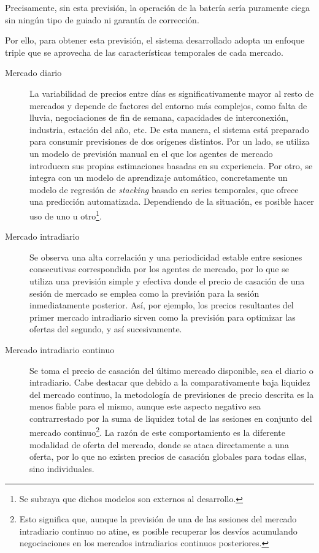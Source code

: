 Precisamente, sin esta previsión, la operación de la batería sería puramente ciega sin ningún tipo de guiado ni garantía de corrección.

Por ello, para obtener esta previsión, el sistema desarrollado adopta un enfoque triple que se aprovecha de las características temporales de cada mercado.

\begin{description}

  \item[Mercado diario] La variabilidad de precios entre días es significativamente mayor al resto de mercados y depende de factores del entorno más complejos, como falta de lluvia, negociaciones de fin de semana, capacidades de interconexión, industria, estación del año, etc. De esta manera, el sistema está preparado para consumir previsiones de dos orígenes distintos. Por un lado, se utiliza un modelo de previsión manual en el que los agentes de mercado introducen sus propias estimaciones basadas en su experiencia. Por otro, se integra con un modelo de aprendizaje automático, concretamente un modelo de regresión de \textit{stacking} basado en series temporales, que ofrece una predicción automatizada. Dependiendo de la situación, es posible hacer uso de uno u otro\footnote{Se subraya que dichos modelos son externos al desarrollo.}.

  \item[Mercado intradiario] Se observa una alta correlación y una periodicidad estable entre sesiones consecutivas correspondida por los agentes de mercado, por lo que se utiliza una previsión simple y efectiva donde el precio de casación de una sesión de mercado se emplea como la previsión para la sesión inmediatamente posterior. Así, por ejemplo, los precios resultantes del primer mercado intradiario sirven como la previsión para optimizar las ofertas del segundo, y así sucesivamente.

  \item[Mercado intradiario continuo] Se toma el precio de casación del último mercado disponible, sea el diario o intradiario. Cabe destacar que debido a la comparativamente baja liquidez del mercado continuo, la metodología de previsiones de precio descrita es la menos fiable para el mismo, aunque este aspecto negativo sea contrarrestado por la suma de liquidez total de las sesiones en conjunto del mercado continuo\footnote{Esto significa que, aunque la previsión de una de las sesiones del mercado intradiario continuo no atine, es posible recuperar los desvíos acumulando negociaciones en los mercados intradiarios continuos posteriores.}. La razón de este comportamiento es la diferente modalidad de oferta del mercado, donde se ataca directamente a una oferta, por lo que no existen precios de casación globales para todas ellas, sino individuales.

\end{description}

